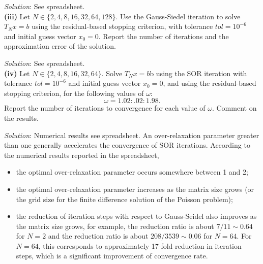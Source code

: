 \documentclass[paper=a4, fontsize=11pt]{scrartcl} %
\numberwithin{equation}{section} %
\numberwithin{figure}{section} %
\numberwithin{table}{section} %
\begin{document}
\textit{Solution}: See spreadsheet.\\

\textbf{(iii)} Let $N \in \{2, 4, 8, 16, 32, 64, 128\}$. Use the Gauss-Siedel iteration to solve $T_N x =b$
using the residual-based stopping criterion, with tolerance $tol = 10^{-6}$ and initial guess
vector $x_0=0$. Report the number of iterations and the approximation error of the
solution.

\textit{Solution}: See spreadsheet.\\

\textbf{(iv)} Let $N \in \{2, 4, 8, 16, 32, 64\}$. Solve $T_N x =b$b using the SOR iteration with tolerance
$tol = 10^{-6}$ and initial guess vector $x_0=0$, and using the residual-based stopping
criterion, for the following values of $\omega$:
$$
\omega = 1.02 : .02 : 1.98.
$$
Report the number of iterations to convergence for each value of $\omega$. Comment on the
results.

\textit{Solution}: Numerical results see spreadsheet. An over-relaxation parameter greater than one generally accelerates the convergence of SOR iterations. According to the numerical results reported in the spreadsheet, 
\begin{itemize}
\item the optimal over-relaxation parameter occurs somewhere between 1 and 2;
\item the optimal over-relaxation parameter increases as the matrix size grows (or the grid size for the finite difference solution of the Poisson problem);
\item the reduction of iteration steps with respect to Gauss-Seidel also improves as the matrix size grows, for example, the reduction ratio is about $7/11\sim0.64$ for $N=2$ and the reduction ratio is about $208/3539\sim 0.06$ for $N=64$. For $N=64$, this corresponds to approximately 17-fold reduction in iteration steps, which is a significant improvement of convergence rate. 
\end{itemize}
\end{document}
